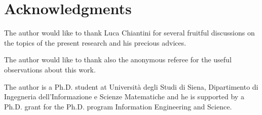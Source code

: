 \documentclass[a4paper,10pt,oneside]{article}
\theoremstyle{casep}
\theoremstyle{definition}
\begin{document}
\section{Acknowledgments}
The author would like to thank Luca Chiantini for several fruitful discussions on the topics of the present research and his precious advices.

The author would like to thank also the anonymous referee for the useful observations about this work.

The author is a Ph.D. student at Universit\`a degli Studi di Siena, Dipartimento di Ingegneria dell'Informazione e Scienze Matematiche and he is supported by a Ph.D. grant for the Ph.D. program Information Engineering and Science.

\nocite{*} 


\end{document}
